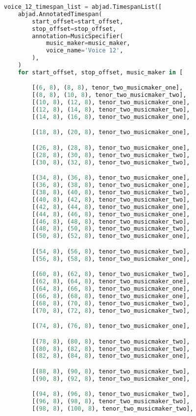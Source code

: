 \begin{lstlisting}[language=Python, caption=Invocation Source Code]
voice_12_timespan_list = abjad.TimespanList([
    abjad.AnnotatedTimespan(
        start_offset=start_offset,
        stop_offset=stop_offset,
        annotation=MusicSpecifier(
            music_maker=music_maker,
            voice_name='Voice 12',
        ),
    )
    for start_offset, stop_offset, music_maker in [

        [(6, 8), (8, 8), tenor_two_musicmaker_one],
        [(8, 8), (10, 8), tenor_two_musicmaker_two],
        [(10, 8), (12, 8), tenor_two_musicmaker_one],
        [(12, 8), (14, 8), tenor_two_musicmaker_two],
        [(14, 8), (16, 8), tenor_two_musicmaker_one],

        [(18, 8), (20, 8), tenor_two_musicmaker_one],

        [(26, 8), (28, 8), tenor_two_musicmaker_one],
        [(28, 8), (30, 8), tenor_two_musicmaker_two],
        [(30, 8), (32, 8), tenor_two_musicmaker_two],

        [(34, 8), (36, 8), tenor_two_musicmaker_one],
        [(36, 8), (38, 8), tenor_two_musicmaker_one],
        [(38, 8), (40, 8), tenor_two_musicmaker_two],
        [(40, 8), (42, 8), tenor_two_musicmaker_two],
        [(42, 8), (44, 8), tenor_two_musicmaker_one],
        [(44, 8), (46, 8), tenor_two_musicmaker_one],
        [(46, 8), (48, 8), tenor_two_musicmaker_two],
        [(48, 8), (50, 8), tenor_two_musicmaker_two],
        [(50, 8), (52, 8), tenor_two_musicmaker_one],

        [(54, 8), (56, 8), tenor_two_musicmaker_two],
        [(56, 8), (58, 8), tenor_two_musicmaker_one],

        [(60, 8), (62, 8), tenor_two_musicmaker_two],
        [(62, 8), (64, 8), tenor_two_musicmaker_one],
        [(64, 8), (66, 8), tenor_two_musicmaker_one],
        [(66, 8), (68, 8), tenor_two_musicmaker_one],
        [(68, 8), (70, 8), tenor_two_musicmaker_two],
        [(70, 8), (72, 8), tenor_two_musicmaker_two],

        [(74, 8), (76, 8), tenor_two_musicmaker_one],

        [(78, 8), (80, 8), tenor_two_musicmaker_two],
        [(80, 8), (82, 8), tenor_two_musicmaker_two],
        [(82, 8), (84, 8), tenor_two_musicmaker_one],

        [(88, 8), (90, 8), tenor_two_musicmaker_two],
        [(90, 8), (92, 8), tenor_two_musicmaker_one],

        [(94, 8), (96, 8), tenor_two_musicmaker_two],
        [(96, 8), (98, 8), tenor_two_musicmaker_two],
        [(98, 8), (100, 8), tenor_two_musicmaker_two],


\end{lstlisting}
